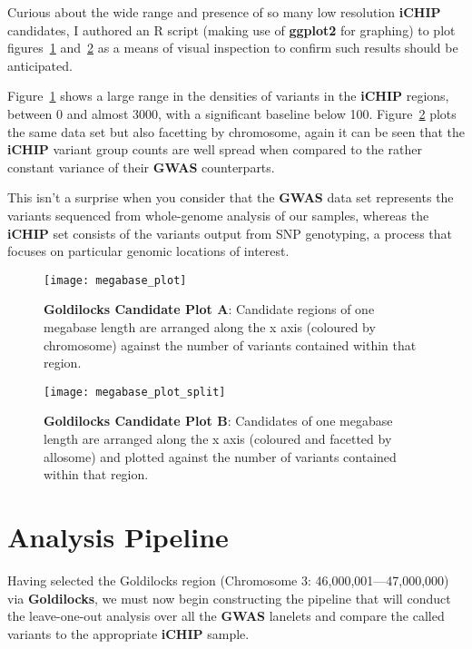Curious about the wide range and presence of so many low resolution
\textbf{iCHIP} candidates, I authored an R script (making use of
\textbf{ggplot2}\citep{ggplot2} for graphing) to plot
figures~\ref{fig:megabaseplot} and~\ref{fig:megabaseplotsplit} as a means of
visual inspection to confirm such results should be anticipated.

Figure~\ref{fig:megabaseplot} shows a large range in the densities of
variants in the \textbf{iCHIP} regions, between 0 and almost 3000, with a
significant baseline below 100. Figure~\ref{fig:megabaseplotsplit} plots the
same data set but also facetting by chromosome, again it can be seen that the
\textbf{iCHIP} variant group counts are well spread when compared to the rather
constant variance of their \textbf{GWAS} counterparts.

This isn't a surprise when you consider that the \textbf{GWAS} data set
represents the variants sequenced from whole-genome analysis of our samples,
whereas the \textbf{iCHIP} set consists of the variants output from SNP
genotyping, a process that focuses on particular genomic locations of interest.


\begin{figure}[htbp!]
    \centering
    \texttt{[image: megabase\_plot]}
    \caption[megabaseplot]{\textbf{Goldilocks Candidate Plot A}: Candidate regions
    of one megabase length are arranged along the x axis (coloured by
chromosome) against the number of variants contained within that region.}
    \label{fig:megabaseplot}
\end{figure}
\begin{figure}[htbp!]
    \centering
    \texttt{[image: megabase\_plot\_split]}
    \caption[megabaseplotsplit]{\textbf{Goldilocks Candidate Plot B}: Candidates
        of one megabase length are arranged along the x axis (coloured
        and facetted by allosome) and plotted against the number of variants contained
    within that region.}
    \label{fig:megabaseplotsplit}
\end{figure}


\chapter{Analysis Pipeline}

Having selected the Goldilocks region (Chromosome 3: 46,000,001---47,000,000)
via \textbf{Goldilocks}, we must now begin constructing the pipeline that will
conduct the leave-one-out analysis over all the \textbf{GWAS} lanelets and
compare the called variants to the appropriate \textbf{iCHIP} sample.

